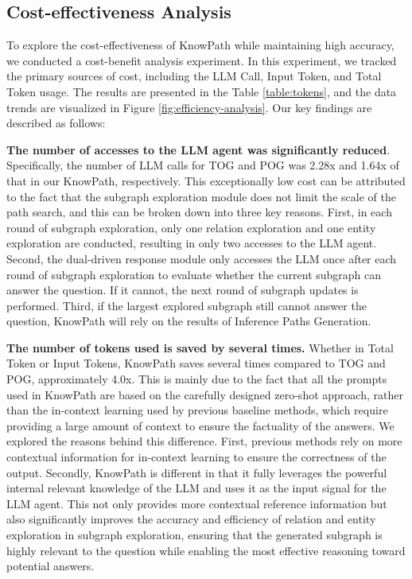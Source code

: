 \subsection{Cost-effectiveness Analysis}

To explore the cost-effectiveness of KnowPath while maintaining high accuracy, we conducted a cost-benefit analysis experiment. In this experiment, we tracked the primary sources of cost, including the LLM Call, Input Token, and Total Token usage. The results are presented in the Table \ref{table:tokens}, and the data trends are visualized in Figure \ref{fig:efficiency-analysis}.
Our key findings are described as follows:


\textbf{The number of accesses to the LLM agent was significantly reduced}. Specifically, the number of LLM calls for TOG and POG was 2.28x and 1.64x of that in our KnowPath, respectively.
This exceptionally low cost can be attributed to the fact that the subgraph exploration module does not limit the scale of the path search, and this can be broken down into three key reasons. First, in each round of subgraph exploration, only one relation exploration and one entity exploration are conducted, resulting in only two accesses to the LLM agent. Second, the dual-driven response module only accesses the LLM once after each round of subgraph exploration to evaluate whether the current subgraph can answer the question. If it cannot, the next round of subgraph updates is performed. Third, if the largest explored subgraph still cannot answer the question, KnowPath will rely on the results of Inference Paths Generation.


\textbf{The number of tokens used is saved by several times.}
Whether in Total Token or Input Tokens, KnowPath saves several times compared to TOG and POG, approximately 4.0x. 
This is mainly due to the fact that all the prompts used in KnowPath are based on the carefully designed zero-shot approach, rather than the in-context learning used by previous baseline methods, which require providing a large amount of context to ensure the factuality of the answers.
We explored the reasons behind this difference.
First, previous methods rely on more contextual information for in-context learning to ensure the correctness of the output.
Secondly, KnowPath is different in that it fully leverages the powerful internal relevant knowledge of the LLM and uses it as the input signal for the LLM agent.
This not only provides more contextual reference information but also significantly improves the accuracy and efficiency of relation and entity exploration in subgraph exploration, ensuring that the generated subgraph is highly relevant to the question while enabling the most effective reasoning toward potential answers.





